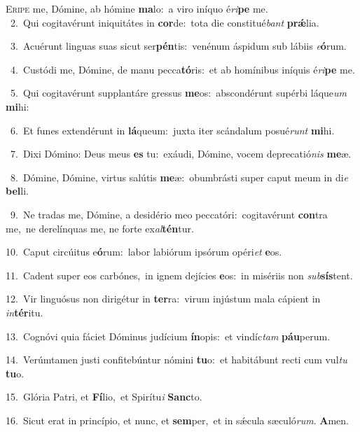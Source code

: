 \lettrine{\initial\textcolor{\initialcolor}{E}}{ripe} me, Dómine, ab hómine \textbf{ma}\-lo:~\star a viro iníquo é\-\textit{ri}\-\textbf{pe} me.\\
{\numbfont\textcolor{\numbcolor}{~2.}}~Qui cogitavérunt iniquitátes in \textbf{cor}\-de:~\star tota die constitué\textit{bant} \textbf{prǽ}\-lia.\par
{\numbfont\textcolor{\numbcolor}{~3.}}~Acuérunt linguas suas sicut ser\-\textbf{pén}\-tis:~\star venénum áspidum sub lábiis \textit{e}\-\textbf{ó}rum.\par
{\numbfont\textcolor{\numbcolor}{~4.}}~Custódi me, Dómine, de manu pecca\-\textbf{tó}\-ris:~\star et ab homínibus iníquis é\-\textit{ri}\-\textbf{pe} me.\par
{\numbfont\textcolor{\numbcolor}{~5.}}~Qui cogitavérunt supplantáre gressus \textbf{me}\-os:~\star abscondérunt supérbi láque\textit{um} \textbf{mi}\-hi:\par
{\numbfont\textcolor{\numbcolor}{~6.}}~Et funes extendérunt in \textbf{lá}\-queum:~\star juxta iter scándalum posué\textit{runt} \textbf{mi}\-hi.\par
{\numbfont\textcolor{\numbcolor}{~7.}}~Dixi Dómino: Deus meus \textbf{es} tu:~\star exáudi, Dómine, vocem deprecatió\textit{nis} \textbf{me}\-æ.\par
{\numbfont\textcolor{\numbcolor}{~8.}}~Dómine, Dómine, virtus salútis \textbf{me}\-æ:~\star obumbrásti super caput meum in di\textit{e} \textbf{bel}\-li.\par
{\numbfont\textcolor{\numbcolor}{~9.}}~Ne tradas me, Dómine, a desidério meo peccatóri:~\dagger cogitavérunt \textbf{con}\-tra me,~\star ne derelínquas me, ne forte ex\-\textit{al}\-\textbf{tén}tur.\par
{\numbfont\textcolor{\numbcolor}{10.}}~Caput circúitus e\-\textbf{ó}\-rum:~\star labor labiórum ipsórum opéri\textit{et} \textbf{e}\-os.\par
{\numbfont\textcolor{\numbcolor}{11.}}~Cadent super eos carbónes,~\dagger in ignem dejícies \textbf{e}\-os:~\star in misériis non \textit{sub}\-\textbf{sís}tent.\par
{\numbfont\textcolor{\numbcolor}{12.}}~Vir linguósus non dirigétur in \textbf{ter}\-ra:~\star virum injústum mala cápient in \textit{in}\-\textbf{tér}itu.\par
{\numbfont\textcolor{\numbcolor}{13.}}~Cognóvi quia fáciet Dóminus judícium \textbf{ín}\-opis:~\star et vindíc\textit{tam} \textbf{páu}\-perum.\par
{\numbfont\textcolor{\numbcolor}{14.}}~Verúmtamen justi confitebúntur nómini \textbf{tu}\-o:~\star et habitábunt recti cum vul\textit{tu} \textbf{tu}\-o.\par
{\numbfont\textcolor{\numbcolor}{15.}}~Glória Patri, et \textbf{Fí}\-lio,~\star et Spirítu\textit{i} \textbf{Sanc}\-to.\par
{\numbfont\textcolor{\numbcolor}{16.}}~Sicut erat in princípio, et nunc, et \textbf{sem}\-per,~\star et in sǽcula sæculó\-\textit{rum}\-. \textbf{A}\-men.\par
